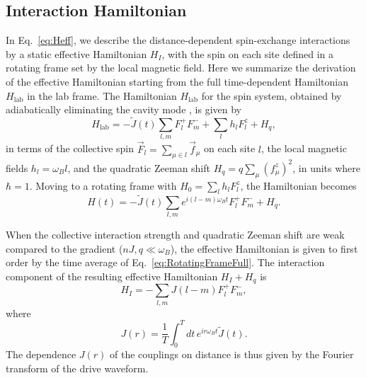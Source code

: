 \documentclass[aps,pra,superscriptaddress,12pt]{revtex4-1} %
\begin{document}
\begin{bibunit}
\subsection{Interaction Hamiltonian}


In Eq.~\eqref{eq:Heff}, we describe the distance-dependent spin-exchange interactions by a static effective Hamiltonian $H_I$, with the spin on each site defined in a rotating frame set by the local magnetic field.  Here we summarize the derivation of the effective Hamiltonian starting from the full time-dependent Hamiltonian $H_\mathrm{lab}$ in the lab frame.  The Hamiltonian $H_\mathrm{lab}$ for the spin system, obtained by adiabatically eliminating the cavity mode \cite{davis2019photon,davis2020protecting}, is given by \begin{equation}\label{eq:Hlab}
H_\text{lab}=-\tilde{J}(t) \sum_{l,m} F^+_l F^-_m + \sum_l h_l F^z_l + H_q,
\end{equation}
in terms of the collective spin $\vec{F}_l = \sum_{\mu \in l} \vec{f}_\mu$ on each site $l$, the local magnetic fields $h_l = \omega_B l$, and the quadratic Zeeman shift $H_q = q \sum_\mu (f^z_\mu)^2$, in units where $\hbar = 1$. Moving to a rotating frame with $H_0 = \sum_l h_l F^z_l$, the Hamiltonian becomes 
\begin{equation}
  H(t)=-\tilde{J}(t) \sum_{l,m} e^{i(l-m)\omega_B t} F^+_l F^-_m + H_q.
  \label{eq:RotatingFrameFull}
\end{equation}

When the collective interaction strength and quadratic Zeeman shift are weak compared to the gradient ($nJ, q \ll \omega_B$), the effective Hamiltonian is given to first order by the time average of Eq.~\eqref{eq:RotatingFrameFull}. The interaction component of the resulting effective Hamiltonian $H_I + H_q$ is
\begin{equation}
  H_I = -\sum_{l,m} J(l-m) F^+_l  F^-_{m},
\end{equation}
where 
\begin{equation}
   J(r) = \frac{1}{T} \int_0^T dt\, e^{i r \omega_B t} \tilde{J}(t).
\end{equation}
The dependence $J(r)$ of the couplings on distance is thus given by the Fourier transform of the drive waveform.


\end{bibunit}
\end{document}
